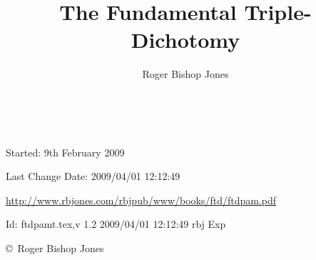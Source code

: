 \documentclass[10pt,a4paper.titlepage,openany,twocolumn]{article}
\author{Roger Bishop Jones}
\title{The Fundamental Triple-Dichotomy}
\date{\ }
\begin{document}
\begin{titlepage}
\maketitle
\begin{abstract}
\end{abstract}

\vfill

\begin{centering}

{\footnotesize

Started: 9th February 2009

Last Change $ $Date: 2009/04/01 12:12:49 $ $

\href{http://www.rbjones.com/rbjpub/www/books/ftd/ftdpam.pdf}
{http://www.rbjones.com/rbjpub/www/books/ftd/ftdpam.pdf}

$ $Id: ftdpamt.tex,v 1.2 2009/04/01 12:12:49 rbj Exp $ $

\copyright\ Roger Bishop Jones

}%

\end{centering}

\thispagestyle{empty}
\end{titlepage}

\onecolumn

{\parskip=0pt\tableofcontents}

\vfill

\pagebreak

\twocolumn
\end{document}
